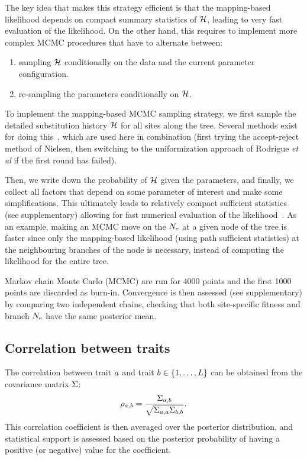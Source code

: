 \documentclass{article}
\begin{document}
    The key idea that makes this strategy efficient is that the mapping-based {likelihood} depends on compact summary statistics of $\mathcal{H}$, leading to very fast evaluation of the {likelihood}.
    On the other hand, this requires to implement more complex {MCMC} procedures that have to alternate between:
    \begin{enumerate}
        \item sampling $\mathcal{H}$ conditionally on the data and the current parameter configuration.
        \item re-sampling the parameters conditionally on $\mathcal{H}$.
    \end{enumerate}

    To implement the mapping-based {MCMC} sampling strategy, we first sample the detailed {substitution} history $\mathcal{H}$ for all sites along the tree.
    Several methods exist for doing this~\citep{Nielsen2002,Rodrigue2008}, which are used here in combination (first trying the accept-reject method of Nielsen, then switching to the uniformization approach of Rodrigue \textit{et al} if the first round has failed).

    Then, we write down the probability of $\mathcal{H}$ given the parameters, and finally, we collect all factors that depend on some parameter of interest and make some simplifications.
    This ultimately leads to relatively compact sufficient statistics (see supplementary) allowing for fast numerical evaluation of the likelihood~\citep{Irvahn2014,Davydov2016}.
    As an example, making an {MCMC} move on the $N_{\text{e}}$ at a given node of the tree is faster since only the mapping-based {likelihood} (using path sufficient statistics) at the neighbouring branches of the node is necessary, instead of computing the likelihood for the entire tree.

    Markov chain Monte Carlo (MCMC) are run for 4000 points and the first 1000 points are discarded as burn-in.
    Convergence is then assessed (see supplementary) by comparing two independent chains, checking that both site-specific fitness and branch $N_{\text{e}}$ have the same posterior mean.

    \subsection{Correlation between traits}
    \label{sec:Correlation}
    The correlation between trait $a$ and trait $b \in \{1, \hdots, L\}$ can be obtained from the covariance matrix $\Sigma$:
    \begin{equation}
        \rho_{a, b} = \dfrac{\Sigma_{a, b}}{\sqrt{\Sigma_{a, a} \Sigma_{b, b}}}.
    \end{equation}
    This correlation coefficient is then averaged over the posterior distribution, and statistical support is assessed based on the posterior probability of having a positive (or negative) value for the coefficient.
\end{document}
